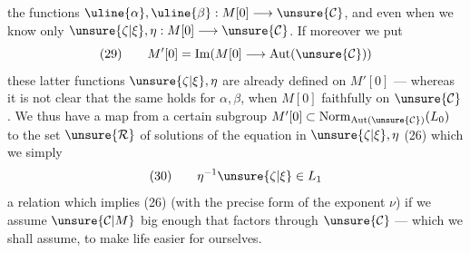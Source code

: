 
the functions $\uline{\alpha},\uline{\beta}:M[0]\longrightarrow\unsure{\mathcal{C}}$,
and even when we know only
$\unsure{\zeta|\xi},\eta:M[0]\longrightarrow\unsure{\mathcal{C}}$.
If moreover we put
\[
(29)\qquad
M'[0]=\operatorname{Im}(M[0]\longrightarrow\operatorname{Aut}(\unsure{\mathcal{C}}))
\]
these latter functions $\unsure{\zeta|\xi},\eta$ are already defined on $M'[0]$ --- whereas it
is not clear that the same holds for $\alpha,\beta$, when
$M[0]$  faithfully on $\unsure{\mathcal{C}}$.
We thus have a map \inserted{$(\unsure{\zeta|\xi},\eta)$} from a certain subgroup
$M'[0]\subset\operatorname{Norm}_{\operatorname{Aut}(\unsure{\mathcal{C}})}(L_0)$
to the set $\unsure{\mathcal{R}}$ of solutions of the equation in $\unsure{\zeta|\xi},\eta$
(26) which we  simply
\[
(30)\qquad \eta^{-1}\unsure{\zeta|\xi}\in L_1
\]
a relation which implies (26) (with the precise form of the exponent $\nu$)
if we assume  $\unsure{\mathcal{C}|M}$ big enough that
factors through $\unsure{\mathcal{C}}$ --- which we shall assume, to make life easier for ourselves.

